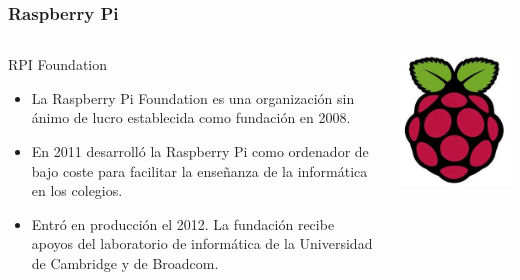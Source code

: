 \documentclass[10pt,colorlinks]{beamer}
\begin{document}
\begin{frame}[fragile]\frametitle{Raspberry Pi}
\begin{columns}[c]
\begin{block}{RPI Foundation}
\begin{itemize}
    \item  La Raspberry Pi Foundation es una organización sin ánimo de lucro establecida  como fundación en 2008.

\item En 2011 desarrolló la Raspberry Pi como ordenador de bajo coste para facilitar la enseñanza de la informática en los colegios.
 
\item Entró en producción el 2012. La fundación recibe apoyos del laboratorio de informática de la Universidad de Cambridge y de Broadcom.
\end{itemize}

\end{block}

    \centering
    \includegraphics[width=1\textwidth]{figs/rpi}
\end{columns}
\end{frame}
\end{document}
